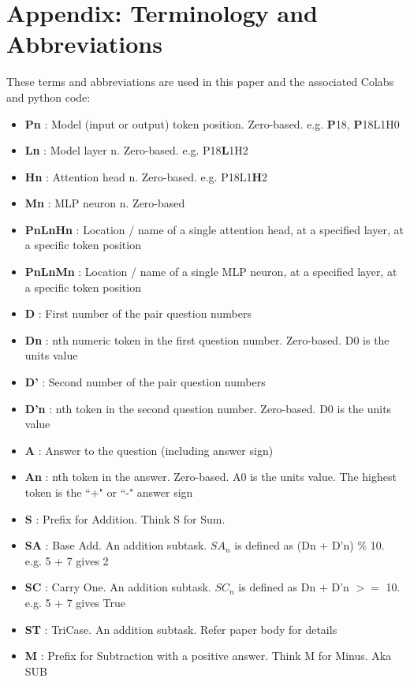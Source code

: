 \documentclass[11pt]{article}
\begin{document}


\appendix

\section{Appendix: Terminology and Abbreviations}
\label{app:Terminology}
These terms and abbreviations are used in this paper and the associated Colabs and python code:

\begin{itemize}
\item \textbf{Pn} : Model (input or output) token position. Zero-based. e.g. \textbf{P}18, \textbf{P}18L1H0
\item \textbf{Ln} : Model layer n. Zero-based. e.g. P18\textbf{L}1H2
\item \textbf{Hn} : Attention head n. Zero-based. e.g. P18L1\textbf{H}2
\item \textbf{Mn} : MLP neuron n. Zero-based
\item \textbf{PnLnHn} : Location / name of a single attention head, at a specified layer, at a specific token position
\item \textbf{PnLnMn} : Location / name of a single MLP neuron, at a specified layer, at a specific token position
\item \textbf{D} : First number of the pair question numbers
\item \textbf{Dn} : nth numeric token in the first question number. Zero-based. D0 is the units value
\item \textbf{D'} : Second number of the pair question numbers
\item \textbf{D'n} : nth token in the second question number. Zero-based. D0 is the units value
\item \textbf{A} : Answer to the question (including answer sign)
\item \textbf{An} : nth token in the answer. Zero-based. A0 is the units value. The highest token is the “+" or “-" answer sign
\item \textbf{S} : Prefix for Addition. Think S for Sum. 
\item \textbf{SA} : Base Add. An addition subtask. $SA_n$ is defined as (Dn + D'n) \% 10. e.g. 5 + 7 gives 2
\item \textbf{SC} : Carry One. An addition subtask. $SC_n$ is defined as Dn + D'n $>=$ 10. e.g. 5 + 7 gives True
\item \textbf{ST} : TriCase. An addition subtask. Refer paper body for details
\item \textbf{M} : Prefix for Subtraction with a positive answer. Think M for Minus. Aka SUB

\end{itemize}
\end{document}

